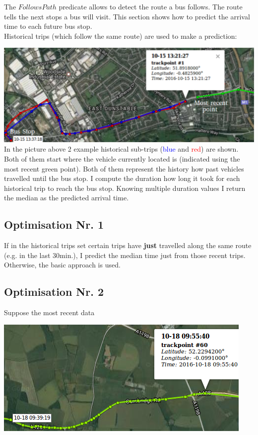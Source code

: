 \documentclass[12pt,a4paper,oneside,openright]{report}
\begin{document}
The $FollowsPath$ predicate allows to detect the route a bus follows.
The route tells the next stops a bus will visit. This section shows how to
predict the arrival time to each future bus stop. \\

Historical trips (which follow the same route) are used to make a prediction:

\includegraphics[width=\textwidth]{figs/future_stop.png} \\

In the picture above 2 example historical sub-trips (\textcolor{blue}{blue}
and \textcolor{red}{red}) are shown.
Both of them start where the vehicle currently located is (indicated
using the most recent green point). Both of them represent the history how past
vehicles travelled until the bus stop. I compute the duration how long it
took for each historical trip to reach the bus stop. Knowing multiple duration
values I return the median as the predicted arrival time.

\subsection{Optimisation Nr. 1}

If in the historical trips set certain trips have \textbf{just} travelled along
the same route (e.g. in the last $30$min.), I predict the median time just from
those recent trips. Otherwise, the basic approach is used.

\subsection{Optimisation Nr. 2}

Suppose the most recent data

\includegraphics[scale = 0.7]{figs/recent_trip.png} \\
\end{document}
